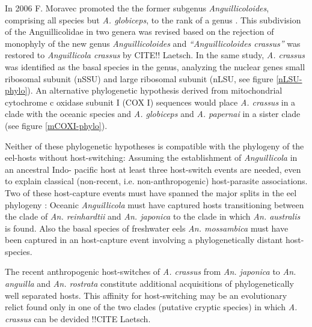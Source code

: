 In 2006 F. Moravec promoted the the former subgenus
\textit{Anguillicoloides}, comprising all species but
\textit{A. globiceps}, to the rank of a genus
\cite{moravec_anguillicoloides}. This subdivision of the
Anguillicolidae in two genera was revised based on the rejection of
monophyly of the new genus \textit{Anguillicoloides} and
\textit{``Anguillicoloides crassus''} was restored to
\textit{Anguillicola crassus} by CITE!! Laetsch. In the same study,
\textit{A. crassus} was identified as the basal species in the genus,
analyzing the nuclear genes small ribosomal subunit (nSSU) and large
ribosomal subunit (nLSU, see figure \ref{nLSU-phylo}). An alternative
phylogenetic hypothesis derived from mitochondrial cytochrome c
oxidase subunit I (COX I) sequences would place \textit{A. crassus} in
a clade with the oceanic species and \textit{A. globiceps} and
\textit{A. papernai} in a sister clade (see figure \ref{mCOXI-phylo}).

Neither of these phylogenetic hypotheses is compatible with the
phylogeny of the eel-hosts without host-switching: Assuming the
establishment of \textit{Anguillicola} in an ancestral Indo- pacific
host at least three host-switch events are needed, even to explain
classical (non-recent, i.e. non-anthropogenic) host-parasite
associations. Two of these host-capture events must have spanned the
major splits in the eel phylogeny \cite{minegishi_molecular_2005}:
Oceanic \textit{Anguillicola} must have captured hosts transitioning
between the clade of \textit{An. reinhardtii} and
\textit{An. japonica} to the clade in which \textit{An. australis} is
found. Also the basal species of freshwater eels
\textit{An. mossambica} must have been captured in an host-capture
event involving a phylogenetically distant host-species.


The recent anthropogenic host-switches of \textit{A. crassus} from
\textit{An. japonica} to \textit{An. anguilla} and
\textit{An. rostrata} constitute additional acquisitions of
phylogenetically well separated hosts. This affinity for
host-switching may be an evolutionary relict found only in one of the
two clades (putative cryptic species) in which \textit{A. crassus} can
be devided !!CITE Laetsch.

